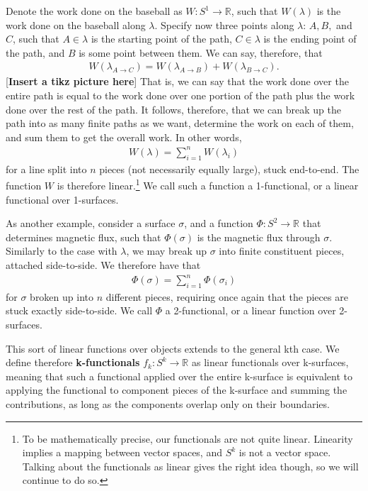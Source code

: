 \documentclass{book}
\begin{document}
Denote the work done on the baseball as $W: S^1 \to \mathbb{R}$, such that $W(\lambda)$ is the work done on the baseball along $\lambda$. Specify now three points along $\lambda$: $A, B,$ and $C$, such that $A \in \lambda$ is the starting point of the path, $C \in \lambda$ is the ending point of the path, and $B$ is some point between them. We can say, therefore, that \begin{gather} W(\lambda_{A\to C}) = W(\lambda_{A \to B}) + W(\lambda_{B \to C}).\end{gather} [\textbf{Insert a tikz picture here}]
That is, we can say that the work done over the entire path is equal to the work done over one portion of the path plus the work done over the rest of the path. It follows, therefore, that we can break up the path into as many finite paths as we want, determine the work on each of them, and sum them to get the overall work. In other words, \begin{gather} W(\lambda) = \sum_{i=1}^{n} W(\lambda_i) \end{gather} for a line split into $n$ pieces (not necessarily equally large), stuck end-to-end. The function $W$ is therefore linear.\footnote{To be mathematically precise, our functionals are not quite linear. Linearity implies a mapping between vector spaces, and $S^k$ is not a vector space. Talking about the functionals as linear gives the right idea though, so we will continue to do so.} We call such a function a 1-functional, or a linear functional over 1-surfaces. 

As another example, consider a surface $\sigma$, and a function $\Phi: S^2 \to \mathbb{R}$ that determines magnetic flux, such that $\Phi(\sigma)$ is the magnetic flux through $\sigma$. Similarly to the case with $\lambda$, we may break up $\sigma$ into finite constituent pieces, attached side-to-side. We therefore have that \begin{gather} \Phi(\sigma) = \sum_{i=1}^n \Phi(\sigma_i) \end{gather} for $\sigma$ broken up into $n$ different pieces, requiring once again that the pieces are stuck exactly side-to-side. We call $\Phi$ a 2-functional, or a linear function over 2-surfaces. 

This sort of linear functions over objects extends to the general kth case. We define therefore \textbf{k-functionals} $f_k : S^k \to \mathbb{R}$ as linear functionals over k-surfaces, meaning that such a functional applied over the entire k-surface is equivalent to applying the functional to component pieces of the k-surface and summing the contributions, as long as the components overlap only on their boundaries. 
\end{document}
